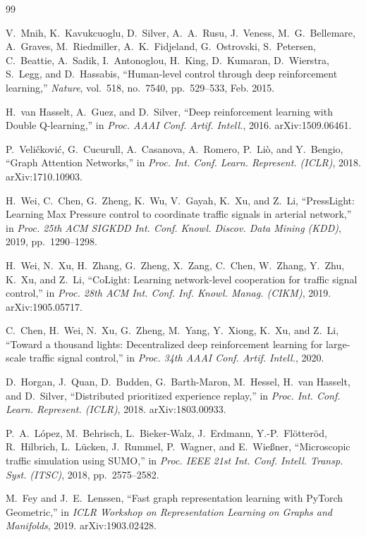 \documentclass[conference]{IEEEtran}
\begin{document}
\begin{thebibliography}{99}

V.~Mnih, K.~Kavukcuoglu, D.~Silver, A.~A.~Rusu, J.~Veness, M.~G.~Bellemare, A.~Graves, M.~Riedmiller, A.~K.~Fidjeland, G.~Ostrovski, S.~Petersen, C.~Beattie, A.~Sadik, I.~Antonoglou, H.~King, D.~Kumaran, D.~Wierstra, S.~Legg, and D.~Hassabis,
``Human-level control through deep reinforcement learning,''
\textit{Nature}, vol.~518, no.~7540, pp.~529--533, Feb. 2015.

H.~van Hasselt, A.~Guez, and D.~Silver,
``Deep reinforcement learning with Double Q-learning,''
in \textit{Proc. AAAI Conf. Artif. Intell.}, 2016.
arXiv:1509.06461.

P.~Veličković, G.~Cucurull, A.~Casanova, A.~Romero, P.~Liò, and Y.~Bengio,
``Graph Attention Networks,''
in \textit{Proc. Int. Conf. Learn. Represent. (ICLR)}, 2018.
arXiv:1710.10903.

H.~Wei, C.~Chen, G.~Zheng, K.~Wu, V.~Gayah, K.~Xu, and Z.~Li,
``PressLight: Learning Max Pressure control to coordinate traffic signals in arterial network,''
in \textit{Proc. 25th ACM SIGKDD Int. Conf. Knowl. Discov. Data Mining (KDD)}, 2019, pp.~1290--1298.

H.~Wei, N.~Xu, H.~Zhang, G.~Zheng, X.~Zang, C.~Chen, W.~Zhang, Y.~Zhu, K.~Xu, and Z.~Li,
``CoLight: Learning network-level cooperation for traffic signal control,''
in \textit{Proc. 28th ACM Int. Conf. Inf. Knowl. Manag. (CIKM)}, 2019.
arXiv:1905.05717.

C.~Chen, H.~Wei, N.~Xu, G.~Zheng, M.~Yang, Y.~Xiong, K.~Xu, and Z.~Li,
``Toward a thousand lights: Decentralized deep reinforcement learning for large-scale traffic signal control,''
in \textit{Proc. 34th AAAI Conf. Artif. Intell.}, 2020.

D.~Horgan, J.~Quan, D.~Budden, G.~Barth-Maron, M.~Hessel, H.~van Hasselt, and D.~Silver,
``Distributed prioritized experience replay,''
in \textit{Proc. Int. Conf. Learn. Represent. (ICLR)}, 2018.
arXiv:1803.00933.

P.~A.~López, M.~Behrisch, L.~Bieker-Walz, J.~Erdmann, Y.-P.~Flötteröd, R.~Hilbrich, L.~Lücken, J.~Rummel, P.~Wagner, and E.~Wießner,
``Microscopic traffic simulation using SUMO,''
in \textit{Proc. IEEE 21st Int. Conf. Intell. Transp. Syst. (ITSC)}, 2018, pp.~2575--2582.

M.~Fey and J.~E.~Lenssen,
``Fast graph representation learning with PyTorch Geometric,''
in \textit{ICLR Workshop on Representation Learning on Graphs and Manifolds}, 2019.
arXiv:1903.02428.

\end{thebibliography}
\end{document}
